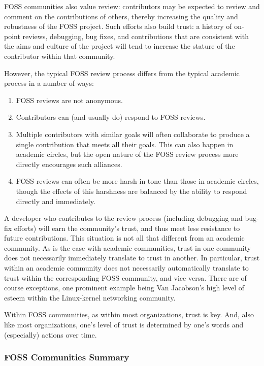 FOSS communities also value review: contributors may be expected to
review and comment on the contributions of others, thereby increasing
the quality and robustness of the FOSS project.
Such efforts also build trust: a history of on-point reviews,
debugging, bug fixes, and
contributions that are consistent with the aims and culture of the project
will tend to increase the stature of the
contributor within that community.

However, the typical FOSS review process differs from the typical
academic process in a number of ways:

\begin{enumerate}
\item	FOSS reviews are not anonymous.
\item	Contributors can (and usually do) respond to FOSS reviews.
\item	Multiple contributors with similar goals will often collaborate
	to produce a single contribution that meets all their goals.
	This can also happen in academic circles, but the open nature
	of the FOSS review process more directly encourages such
	alliances.
\item	FOSS reviews can often be more harsh in tone than those in
	academic circles, though the effects of this harshness are
	balanced by the ability to respond directly and immediately.
\end{enumerate}

A developer who contributes to the review process (including debugging
and bug-fix efforts) will
earn the community's trust, and thus meet less resistance to
future contributions.
This situation is not all that different from an academic community.
As is the case with academic communities,
trust in one community does not necessarily immediately translate
to trust in another.
In particular, trust within an academic community
does not necessarily automatically translate to trust within the
corresponding FOSS community, and vice versa.
There are of course exceptions, one prominent example being Van Jacobson's
high level of esteem within the Linux-kernel networking community.

Within FOSS communities, as within most organizations, trust is key.
And, also like most organizations, one's level of trust is determined
by one's words and (especially) actions over time.

\subsubsection{FOSS Communities Summary}
\label{sec:app:rcuhist:FOSS Communities Summary}

